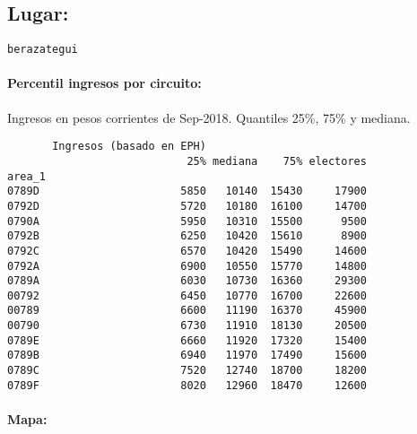 \documentclass[11pt]{article}
\begin{document}
    
    \hypertarget{lugar}{%
\subsection{Lugar:}\label{lugar}}

    
    \begin{Verbatim}[commandchars=\\\{\}]
berazategui

    \end{Verbatim}

    \hypertarget{percentil-ingresos-por-circuito}{%
\paragraph{Percentil ingresos por
circuito:}\label{percentil-ingresos-por-circuito}}

    
    Ingresos en pesos corrientes de Sep-2018. Quantiles 25\%, 75\% y
mediana.

    
    
    \begin{verbatim}
       Ingresos (basado en EPH)                         
                            25% mediana    75% electores
area_1                                                  
0789D                      5850   10140  15430     17900
0792D                      5720   10180  16100     14700
0790A                      5950   10310  15500      9500
0792B                      6250   10420  15610      8900
0792C                      6570   10420  15490     14600
0792A                      6900   10550  15770     14800
0789A                      6030   10730  16360     29300
00792                      6450   10770  16700     22600
00789                      6600   11190  16370     45900
00790                      6730   11910  18130     20500
0789E                      6660   11920  17320     15400
0789B                      6940   11970  17490     15600
0789C                      7520   12740  18700     18200
0789F                      8020   12960  18470     12600
    \end{verbatim}

    
    \hypertarget{mapa}{%
\paragraph{Mapa:}\label{mapa}}

    
    \begin{center}
    \end{center}
    { \hspace*{\fill} \\}
    
\end{document}
